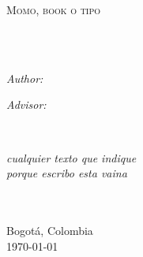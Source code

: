 \documentclass[11pt,english, singlespacing,headsepline,
]{MastersDoctoralThesis}
\author{Juan C. \textsc{Gallego}} %
\begin{document}
\frontmatter %

\pagestyle{plain} %


\begin{titlepage}
\begin{center}

\vspace*{.06\textheight}
{\scshape\LARGE \univname\par}\vspace{1.5cm} %
\textsc{\Large Momo, book o tipo}\\[0.5cm] %

\HRule \\[0.4cm] %
{\huge \bfseries \ttitle\par}\vspace{0.4cm} %
\HRule \\[1.5cm] %
 
\begin{minipage}[t]{0.4\textwidth}
\begin{flushleft} \large
\emph{Author:}\\
\href{mailto:jc.gallego10@uniandes.edu.co}{\authorname} %
\end{flushleft}
\end{minipage}
\begin{minipage}[t]{0.4\textwidth}
\begin{flushright} \large
\emph{Advisor:} \\
\href{www.thisisnothing.com}{\supname} %
\end{flushright}
\end{minipage}\\[3cm]
 
\vfill

\large \textit{cualquier texto que indique \\ porque escribo esta vaina}\\[0.7cm] %
\deptname\\\facname\\[2cm] %
 
\vfill

Bogotá, Colombia\\
{\large \today}\\[4cm] %
 
\vfill
\end{center}
\end{titlepage}
\end{document}
